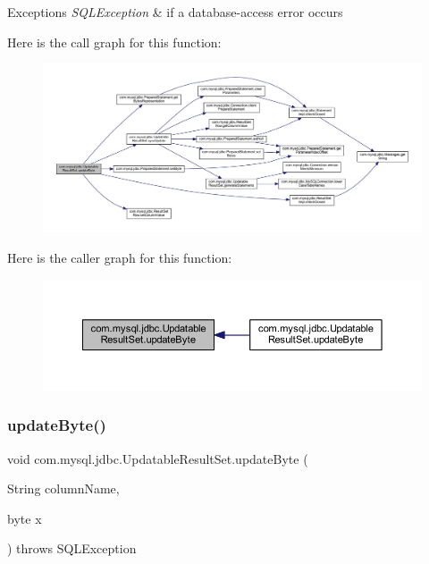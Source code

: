 \begin{DoxyExceptions}{Exceptions}
{\em S\+Q\+L\+Exception} & if a database-\/access error occurs \\
\hline
\end{DoxyExceptions}
Here is the call graph for this function\+:
\nopagebreak
\begin{figure}[H]
\begin{center}
\leavevmode
\includegraphics[width=350pt]{classcom_1_1mysql_1_1jdbc_1_1_updatable_result_set_a82e4ac17d1f8d3b8cdb10d1a6220796d_cgraph}
\end{center}
\end{figure}
Here is the caller graph for this function\+:
\nopagebreak
\begin{figure}[H]
\begin{center}
\leavevmode
\includegraphics[width=350pt]{classcom_1_1mysql_1_1jdbc_1_1_updatable_result_set_a82e4ac17d1f8d3b8cdb10d1a6220796d_icgraph}
\end{center}
\end{figure}
\mbox{\label{classcom_1_1mysql_1_1jdbc_1_1_updatable_result_set_afcff8e1503aeeb94781ec5e18c5cf13d}} 
\subsubsection{\texorpdfstring{update\+Byte()}{updateByte()}\hspace{0.1cm}{\footnotesize\ttfamily [2/2]}}
{\footnotesize\ttfamily void com.\+mysql.\+jdbc.\+Updatable\+Result\+Set.\+update\+Byte (\begin{DoxyParamCaption}\item[{String}]{column\+Name,  }\item[{byte}]{x }\end{DoxyParamCaption}) throws S\+Q\+L\+Exception}

